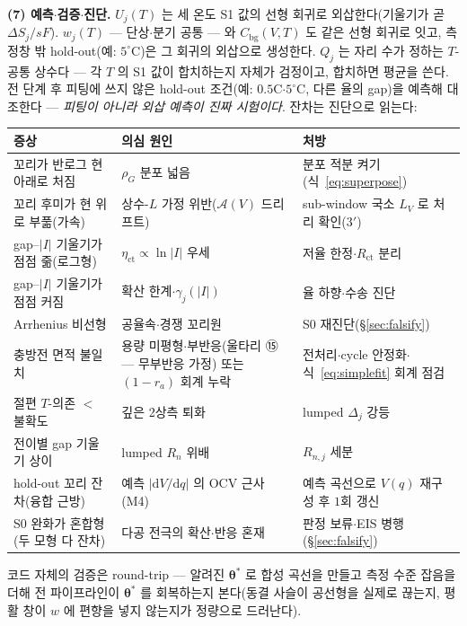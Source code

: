 \documentclass[11pt,a4paper]{article}
\newcommand{\dd}{\mathrm{d}}
\newcommand{\bg}{\mathrm{bg}}
\begin{document}
\textbf{(7) 예측$\cdot$검증$\cdot$진단.} $U_j(T)$ 는 세 온도 S1 값의 선형 회귀로 외삽한다(기울기가
곧 $\Delta S_j/sF$). $w_j(T)$ — 단상$\cdot$분기 공통 — 와 $C_\bg(V,T)$ 도 같은 선형 회귀로 잇고,
측정창 밖 hold-out(예: $5^\circ$C)은 그 회귀의 외삽으로 생성한다. $Q_j$ 는 자리 수가 정하는
$T$-공통 상수다 — 각 $T$ 의 S1 값이 합치하는지 자체가 검정이고, 합치하면 평균을 쓴다. 전 단계 후 피팅에 쓰지
않은 hold-out 조건(예: $0.5$C$\cdot$$5^\circ$C, 다른 율의 gap)을 예측해 대조한다 — \emph{피팅이 아니라
외삽 예측이 진짜 시험이다}. 잔차는 진단으로 읽는다:
\begin{center}
\renewcommand{\arraystretch}{1.3}
\begin{tabular}{p{} p{} p{}}
\toprule
증상 & 의심 원인 & 처방 \\
\midrule
꼬리가 반로그 현 아래로 처짐 & $\rho_G$ 분포 넓음 & 분포 적분 켜기(식~\eqref{eq:superpose}) \\
꼬리 후미가 현 위로 부풂(가속) & 상수-$L$ 가정 위반($\mathcal A(V)$ 드리프트) & sub-window 국소 $L_V$ 로 처리 확인(3$'$) \\
gap--$|I|$ 기울기가 점점 줆(로그형) & $\eta_{\mathrm{ct}}\propto\ln|I|$ 우세 & 저율 한정$\cdot$$R_{\mathrm{ct}}$ 분리 \\
gap--$|I|$ 기울기가 점점 커짐 & 확산 한계$\cdot$$\gamma_j(|I|)$ & 율 하향$\cdot$수송 진단 \\
Arrhenius 비선형 & 공율속$\cdot$경쟁 꼬리원 & S0 재진단(\S\ref{sec:falsify}) \\
충방전 면적 불일치 & 용량 미평형$\cdot$부반응(울타리 ⑮ — 무부반응 가정) 또는 $(1{-}r_a)$ 회계 누락 & 전처리$\cdot$cycle 안정화$\cdot$식~\eqref{eq:simplefit} 회계 점검 \\
절편 $T$-의존 $<$ 불확도 & 깊은 2상측 퇴화 & lumped $\Delta_j$ 강등 \\
전이별 gap 기울기 상이 & lumped $R_n$ 위배 & $R_{n,j}$ 세분 \\
hold-out 꼬리 잔차(융합 근방) & 예측 $|\dd V/\dd q|$ 의 OCV 근사(M4) & 예측 곡선으로 $V(q)$ 재구성 후 $1$회 갱신 \\
S0 완화가 혼합형(두 모형 다 잔차) & 다공 전극의 확산$\cdot$반응 혼재 & 판정 보류$\cdot$EIS 병행(\S\ref{sec:falsify}) \\
\bottomrule
\end{tabular}
\end{center}
코드 자체의 검증은 round-trip — 알려진 $\bm\theta^\ast$ 로 합성 곡선을 만들고 측정 수준 잡음을 더해 전
파이프라인이 $\bm\theta^\ast$ 를 회복하는지 본다(동결 사슬이 공선형을 실제로 끊는지, 평활 창이 $w$ 에
편향을 넣지 않는지가 정량으로 드러난다).
\end{document}
